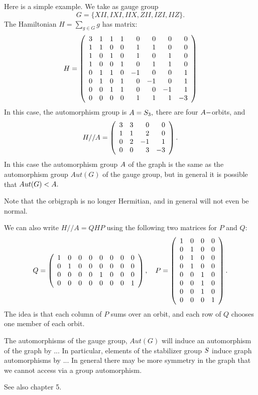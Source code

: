 \documentclass[12pt]{article}
\begin{document}
Here is a simple example. %
We take as gauge group 
$$G = \{XII, IXI, IIX, ZII, IZI, IIZ\}.$$
The Hamiltonian $H = \sum_{g\in G} g$ has matrix:
$$
H = \left(\begin{array}{rrrrrrrr}
 3 &  1 &  1 &  1 &  0 &  0 &  0 &  0 \cr
  1 &  1 &  0 &  0 &  1 &  1 &  0 &  0 \cr
  1 &  0 &  1 &  0 &  1 &  0 &  1 &  0 \cr
  1 &  0 &  0 &  1 &  0 &  1 &  1 &  0 \cr
  0 &  1 &  1 &  0 & -1 &  0 &  0 &  1 \cr
  0 &  1 &  0 &  1 &  0 & -1 &  0 &  1 \cr
  0 &  0 &  1 &  1 &  0 &  0 & -1 &  1 \cr
  0 &  0 &  0 &  0 &  1 &  1 &  1 & -3
\end{array}\right)
$$
In this case, the automorphism group is $A=S_3,$
there are four $A-$orbits, and
$$
H//A = \left(\begin{array}{rrrr}
 3 &  3 &  0 &  0 \cr
  1 &  1 &  2 &  0 \cr
  0 &  2 & -1 &  1 \cr
  0 &  0 &  3 & -3
\end{array}\right).
$$
In this case the automorphism group $A$ of the graph
is the same as the automorphism group $Aut(G)$ of the gauge group,
but in general it is possible that $Aut(G) < A.$

Note that the orbigraph is no longer Hermitian,
and in general will not even be normal.

We can also write $H//A = QHP$ using the following two matrices for $P$ and $Q:$
$$
Q = 
\left(\begin{array}{rrrrrrrr}
 1 &  0 &  0 &  0 &  0 &  0 &  0 &  0 \cr
  0 &  1 &  0 &  0 &  0 &  0 &  0 &  0 \cr
  0 &  0 &  0 &  0 &  1 &  0 &  0 &  0 \cr
  0 &  0 &  0 &  0 &  0 &  0 &  0 &  1
\end{array}\right),\ \ \ 
P = 
\left(\begin{array}{rrrr}
 1 &  0 &  0 &  0 \cr
  0 &  1 &  0 &  0 \cr
  0 &  1 &  0 &  0 \cr
  0 &  1 &  0 &  0 \cr
  0 &  0 &  1 &  0 \cr
  0 &  0 &  1 &  0 \cr
  0 &  0 &  1 &  0 \cr
  0 &  0 &  0 &  1
\end{array}\right).
$$
The idea is that each column of $P$ sums over an orbit,
and each row of $Q$ chooses one member of each orbit.

The automorphisms of the gauge group, $Aut(G)$ will induce an
automorphism of the graph by ...
In particular, elements of the stabilizer group $S$ induce graph 
automorphisms by ...
In general there may be more symmetry in the graph that
we cannot access via a group automorphism.

See also \cite{Cvetkovic1980} chapter 5.
\end{document}
